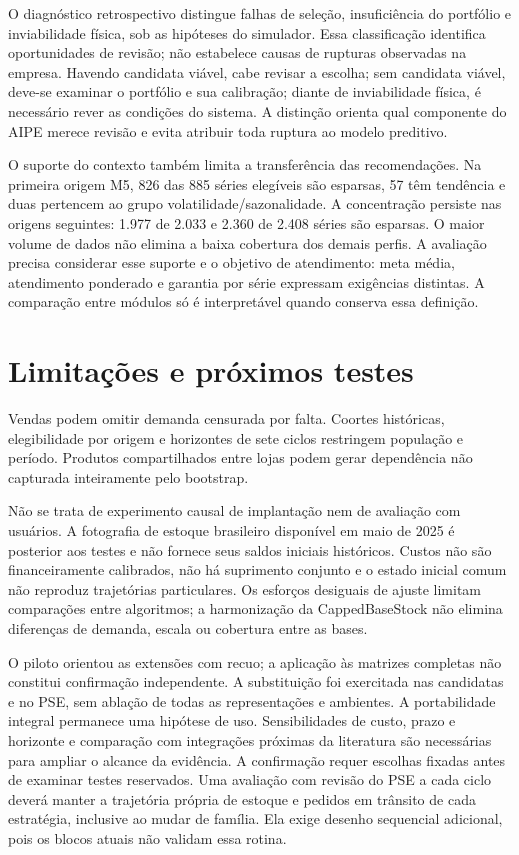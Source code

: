 \documentclass[preprint,12pt]{elsarticle}
\begin{document}
O diagnóstico retrospectivo distingue falhas de seleção, insuficiência do portfólio e inviabilidade física, sob as hipóteses do simulador. Essa classificação identifica oportunidades de revisão; não estabelece causas de rupturas observadas na empresa. Havendo candidata viável, cabe revisar a escolha; sem candidata viável, deve-se examinar o portfólio e sua calibração; diante de inviabilidade física, é necessário rever as condições do sistema. A distinção orienta qual componente do AIPE merece revisão e evita atribuir toda ruptura ao modelo preditivo.

O suporte do contexto também limita a transferência das recomendações. Na primeira origem M5, 826 das 885 séries elegíveis são esparsas, 57 têm tendência e duas pertencem ao grupo volatilidade/sazonalidade. A concentração persiste nas origens seguintes: 1.977 de 2.033 e 2.360 de 2.408 séries são esparsas. O maior volume de dados não elimina a baixa cobertura dos demais perfis. A avaliação precisa considerar esse suporte e o objetivo de atendimento: meta média, atendimento ponderado e garantia por série expressam exigências distintas. A comparação entre módulos só é interpretável quando conserva essa definição.

\section{Limitações e próximos testes}
Vendas podem omitir demanda censurada por falta. Coortes históricas, elegibilidade por origem e horizontes de sete ciclos restringem população e período. Produtos compartilhados entre lojas podem gerar dependência não capturada inteiramente pelo bootstrap.

Não se trata de experimento causal de implantação nem de avaliação com usuários. A fotografia de estoque brasileiro disponível em maio de 2025 é posterior aos testes e não fornece seus saldos iniciais históricos. Custos não são financeiramente calibrados, não há suprimento conjunto e o estado inicial comum não reproduz trajetórias particulares. Os esforços desiguais de ajuste limitam comparações entre algoritmos; a harmonização da CappedBaseStock não elimina diferenças de demanda, escala ou cobertura entre as bases.

O piloto orientou as extensões com recuo; a aplicação às matrizes completas não constitui confirmação independente. A substituição foi exercitada nas candidatas e no PSE, sem ablação de todas as representações e ambientes. A portabilidade integral permanece uma hipótese de uso. Sensibilidades de custo, prazo e horizonte e comparação com integrações próximas da literatura são necessárias para ampliar o alcance da evidência. A confirmação requer escolhas fixadas antes de examinar testes reservados. Uma avaliação com revisão do PSE a cada ciclo deverá manter a trajetória própria de estoque e pedidos em trânsito de cada estratégia, inclusive ao mudar de família. Ela exige desenho sequencial adicional, pois os blocos atuais não validam essa rotina.
\end{document}
